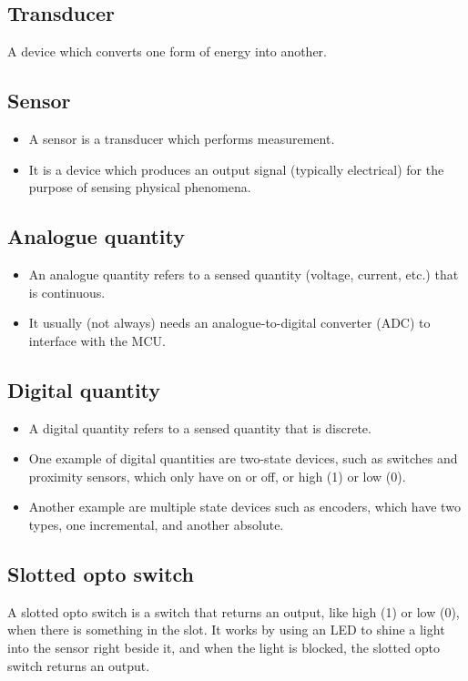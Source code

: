 \documentclass[11pt]{article}
\begin{document}
\subsection{Transducer}
\label{sec:org214f44d}
A device which converts one form of energy into another.

\subsection{Sensor}
\label{sec:orgf5802db}
\begin{itemize}
\item A sensor is a transducer which performs measurement.
\item It is a device which produces an output signal (typically electrical) for the purpose of sensing physical phenomena.
\end{itemize}

\subsection{Analogue quantity}
\label{sec:orgdc0b605}
\begin{itemize}
\item An analogue quantity refers to a sensed quantity (voltage, current, etc.) that is continuous.
\item It usually (not always) needs an analogue-to-digital converter (ADC) to interface with the MCU.
\end{itemize}

\subsection{Digital quantity}
\label{sec:org307bc6e}
\begin{itemize}
\item A digital quantity refers to a sensed quantity that is discrete.
\item One example of digital quantities are two-state devices, such as switches and proximity sensors, which only have on or off, or high (1) or low (0).
\item Another example are multiple state devices such as encoders, which have two types, one incremental, and another absolute.
\end{itemize}

\subsection{Slotted opto switch}
\label{sec:org42528e4}
A slotted opto switch is a switch that returns an output, like high (1) or low (0), when there is something in the slot. It works by using an LED to shine a light into the sensor right beside it, and when the light is blocked, the slotted opto switch returns an output.
\end{document}
